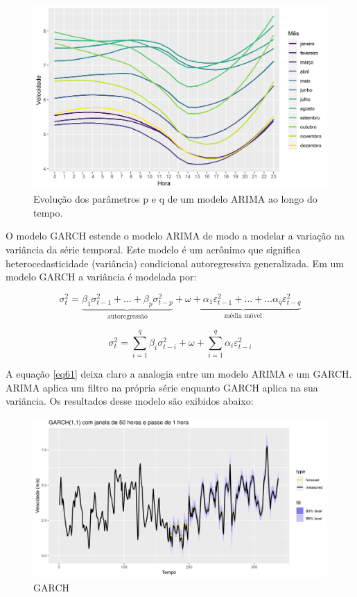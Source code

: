 \documentclass[
	12pt,				%
	openright,			%
	oneside,			%
	a4paper,			%
	english,			%
	french,				%
	spanish,			%
	brazil				%
	]{abntex2}
\begin{document}
\begin{figure}[h]
    \centering
	\includegraphics[width=\textwidth]{diurnal}
	\caption{Evolução dos parâmetros p e q de um modelo ARIMA ao longo do tempo.}
\end{figure}
\FloatBarrier

O modelo GARCH estende o modelo ARIMA de modo a modelar a variação na variância da série temporal. Este modelo é um acrônimo que significa heterocedasticidade (variância) condicional autoregressiva generalizada. Em um modelo GARCH a variância é modelada por:

\begin{equation}\label{eq61}
\sigma_t^2 = \underbrace{\beta_1\sigma_{t-1}^2 + \dots + \beta_p\sigma_{t-p}^2}_\text{autoregressão}  + \underbrace{\omega + \alpha_1\varepsilon_{t-1}^2 + \dots + \dots \alpha_q\varepsilon_{t-q}^2}_\text{média móvel} 
\end{equation}

\begin{equation}
\sigma_t^2 = \sum\limits_{i=1}^q\beta_i\sigma_{t-i}^2 + \omega + \sum\limits_{i=1}^q\alpha_i\varepsilon_{t-i}^2
\end{equation}

A equação \ref{eq61} deixa claro a analogia entre um modelo ARIMA e um GARCH. ARIMA aplica um filtro na própria série enquanto GARCH aplica na sua variância. Os resultados desse modelo são exibidos abaixo:

\begin{figure}[h]
    \centering
	\includegraphics[width=\textwidth]{garch_first}
	\caption{GARCH}
	\label{fig:garch}
\end{figure}
\FloatBarrier
\end{document}
